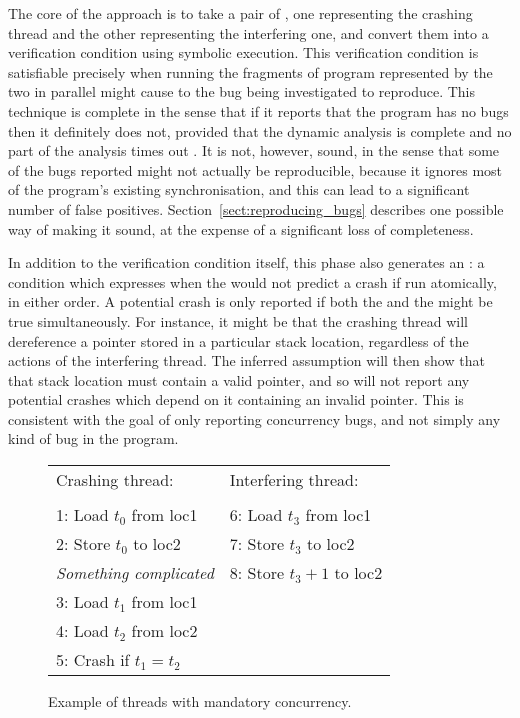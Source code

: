 The core of the approach is to take a pair of {\StateMachines}, one
representing the crashing thread and the other representing the
interfering one, and convert them into a verification
condition\needCite{} using symbolic execution\needCite{}.  This
verification condition is satisfiable precisely when running the
fragments of program represented by the two {\StateMachines} in
parallel might cause to the bug being investigated to reproduce.  This
technique is complete in the sense that if it reports that the program
has no bugs then it definitely does not, provided that the dynamic
analysis is complete and no part of the analysis times out .  It is not, however, sound,
in the sense that some of the bugs reported might not actually be
reproducible, because it ignores most of the program's existing
synchronisation, and this can lead to a significant number of false
positives.  Section~\ref{sect:reproducing_bugs} describes one possible
way of making it sound, at the expense of a significant loss of
completeness.

In addition to the verification condition itself, this phase also
generates an : a condition which expresses
when the {\StateMachines} would not predict a crash if run atomically,
in either order.  A potential crash is only reported if both the
 and the 
might be true simultaneously.  For instance, it might be that the
crashing thread will dereference a pointer stored in a particular
stack location, regardless of the actions of the interfering thread.
The inferred assumption will then show that that stack location must
contain a valid pointer, and so {\technique} will not report any
potential crashes which depend on it containing an invalid pointer.
This is consistent with the goal of only reporting concurrency bugs,
and not simply any kind of bug in the program.

\begin{figure}
\begin{centering}
\hfill
\begin{tabular}{p{8cm}l}
Crashing thread:\hfill         & Interfering thread: \\
\\
1: Load $t_0$ from loc1        & 6: Load $t_3$ from loc1 \\
2: Store $t_0$ to loc2         & 7: Store $t_3$ to loc2 \\
\textit{Something complicated} & 8: Store $t_3 + 1$ to loc2 \\
3: Load $t_1$ from loc1        & \\
4: Load $t_2$ from loc2        & \\
5: Crash if $t_1 = t_2$ & \\
\end{tabular}
\hfill
\end{centering}
\caption{Example of threads with mandatory concurrency.}
\label{fig:mandatory_concurrency1}
\end{figure}

